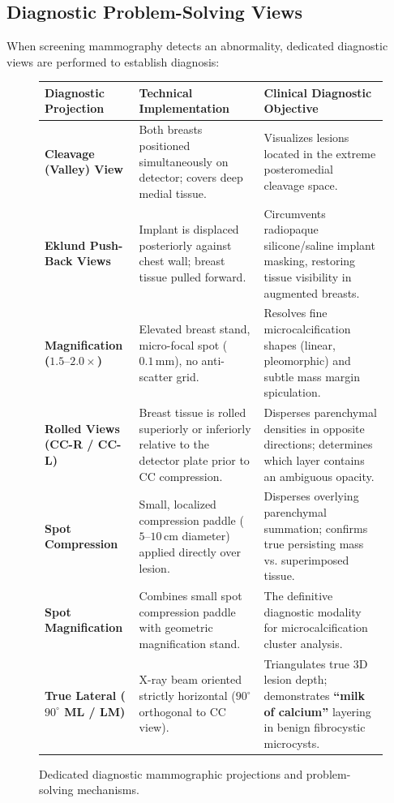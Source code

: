 \documentclass[11pt,a4paper]{article}
\begin{document}
\subsection{Diagnostic Problem-Solving Views}

When screening mammography detects an abnormality, dedicated diagnostic views are performed to establish diagnosis:

\begin{figure}[htbp]
\centering
\setlength{\tabcolsep}{4pt}
\begin{tabular}{p{3.5cm}p{5.5cm}p{5.5cm}}
\toprule
\textbf{Diagnostic Projection} & \textbf{Technical Implementation} & \textbf{Clinical Diagnostic Objective} \\
\midrule
\textbf{Cleavage (Valley) View} & Both breasts positioned simultaneously on detector; covers deep medial tissue. & Visualizes lesions located in the extreme posteromedial cleavage space. \\
\addlinespace
\textbf{Eklund Push-Back Views} & Implant is displaced posteriorly against chest wall; breast tissue pulled forward. & Circumvents radiopaque silicone/saline implant masking, restoring tissue visibility in augmented breasts. \\
\addlinespace
\textbf{Magnification ($1.5\text{--}2.0\times$)} & Elevated breast stand, micro-focal spot ($0.1\,\text{mm}$), no anti-scatter grid. & Resolves fine microcalcification shapes (linear, pleomorphic) and subtle mass margin spiculation. \\
\addlinespace
\textbf{Rolled Views (CC-R / CC-L)} & Breast tissue is rolled superiorly or inferiorly relative to the detector plate prior to CC compression. & Disperses parenchymal densities in opposite directions; determines which layer contains an ambiguous opacity. \\
\addlinespace
\textbf{Spot Compression} & Small, localized compression paddle ($5\text{--}10\,\text{cm}$ diameter) applied directly over lesion. & Disperses overlying parenchymal summation; confirms true persisting mass vs. superimposed tissue. \\
\addlinespace
\textbf{Spot Magnification} & Combines small spot compression paddle with geometric magnification stand. & The definitive diagnostic modality for microcalcification cluster analysis. \\
\addlinespace
\textbf{True Lateral ($90^\circ$ ML / LM)} & X-ray beam oriented strictly horizontal ($90^\circ$ orthogonal to CC view). & Triangulates true 3D lesion depth; demonstrates \textbf{``milk of calcium''} layering in benign fibrocystic microcysts. \\
\bottomrule
\end{tabular}
\caption{Dedicated diagnostic mammographic projections and problem-solving mechanisms.}
\label{tab:diagnostic_views}
\end{figure}
\end{document}
